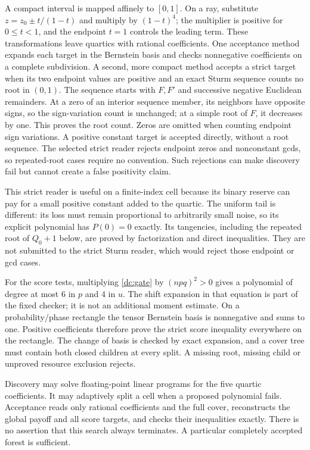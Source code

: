 A compact interval is mapped affinely to $[0,1]$. On a ray, substitute
$z=z_0\pm t/(1-t)$ and multiply by $(1-t)^4$; the multiplier is positive
for $0\le t<1$, and the endpoint $t=1$ controls the leading term.
These transformations leave quartics with rational coefficients.
One acceptance method expands each target in the Bernstein basis and
checks nonnegative coefficients on a complete subdivision. A second,
more compact method accepts a strict target when its two endpoint values
are positive and an exact Sturm sequence counts no root in $(0,1)$.
The sequence starts with $F,F'$ and successive negative Euclidean
remainders. At a zero of an interior sequence member, its neighbors have
opposite signs, so the sign-variation count is unchanged; at a simple
root of $F$, it decreases by one. This proves the root count.
Zeros are omitted when counting endpoint sign variations. A positive
constant target is accepted directly, without a root sequence.
The selected strict reader rejects endpoint zeros and nonconstant gcds,
so repeated-root cases require no convention. Such rejections can make
discovery fail but cannot create a false positivity claim.

This strict reader is useful on a finite-index cell because its binary
reserve can pay for a small positive constant added to the quartic.
The uniform tail is different: its loss must remain proportional to
arbitrarily small noise, so its explicit polynomial has $P(0)=0$ exactly.
Its tangencies, including the repeated root of $Q_0+1$ below, are proved
by factorization and direct inequalities. They are not submitted to the
strict Sturm reader, which would reject those endpoint or gcd cases.

For the score tests, multiplying \eqref{dc:gate} by $(npq)^2>0$ gives a
polynomial of degree at most $6$ in $p$ and $4$ in $u$. The shift expansion
in that equation is part of the fixed checker; it is not an additional
moment estimate. On a probability/phase rectangle the tensor Bernstein
basis is nonnegative and sums to one. Positive coefficients therefore
prove the strict score inequality everywhere on the rectangle.
The change of basis is checked by exact expansion, and a cover tree must
contain both closed children at every split. A missing root, missing
child or unproved resource exclusion rejects.

Discovery may solve floating-point linear programs for the five quartic
coefficients. It may adaptively split a cell when a proposed polynomial
fails. Acceptance reads only rational coefficients and the full cover,
reconstructs the global payoff and all score targets, and checks their
inequalities exactly. There is no assertion that this search always
terminates. A particular completely accepted forest is sufficient.

